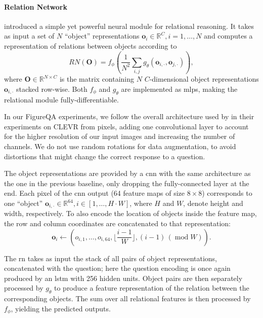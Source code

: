 \documentclass{article} \usepackage{iclr2018_workshop,times}
\begin{document}
\paragraph{Relation Network} 
\citet{santoro2017simple} introduced a simple yet powerful neural module for relational reasoning. It takes as input a set of $N$ ``object'' representations $\mathbf{o}_i\in\mathbb{R}^C, i=1,\dots,N$ and computes a representation of relations between objects according to
\begin{equation}
    \label{eq:rn}
    RN(\mathbf{O}) = f_\phi\left(\frac{1}{N^2}\sum\limits_{i,j} g_\theta(\mathbf{o}_{i,\cdot}, \mathbf{o}_{j, \cdot})\right),
\end{equation}
where $\mathbf{O}\in\mathbb{R}^{N\times C}$ is the matrix containing $N$ $C$-dimensional object representations $\mathbf{o}_{i,\cdot}$ stacked row-wise.
Both $f_\phi$ and $g_\theta$ are implemented as \glspl{mlp}, making the relational module fully-differentiable.

In our FigureQA experiments, we follow the overall architecture used by \citet{santoro2017simple} in their experiments on CLEVR from pixels, adding one convolutional layer to account for the higher resolution of our input images and increasing the number of channels. We do not use random rotations for data augmentation, to avoid distortions that might change the correct response to a question.

The object representations are provided by a \gls{cnn} with the same architecture as the one in the previous baseline, only dropping the fully-connected layer at the end. 
Each pixel of the \gls{cnn} output (64 feature maps of size $8\times8$) corresponds to one ``object'' $\mathbf{o}_{i, \cdot}\in\mathbb{R}^{64}, i\in[1,\dots,H \cdot W]$,
where $H$ and $W$, denote height and width, respectively. 
To also encode the location of objects inside the feature map, the row and column coordinates are concatenated to that representation:
\begin{equation}
    \mathbf{o}_i \leftarrow (o_{i,1}, \dots, o_{i,64}, \lfloor\frac{i-1}{W}\rfloor, (i-1) \,(\operatorname{mod} W)).
\end{equation}

The \gls{rn} takes as input the stack of all pairs of object representations, concatenated with the question; here the question encoding is once again produced by an \gls{lstm} with 256 hidden units. 
Object pairs are then separately processed by $g_\theta$ to produce a feature representation of the relation between the corresponding objects. The sum over all relational features is then processed by $f_\phi$, yielding the predicted outputs.
\end{document}
